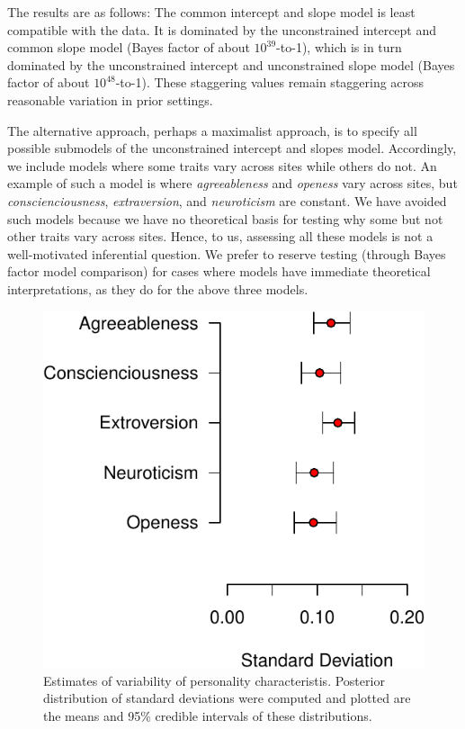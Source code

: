 \documentclass[english,man]{apa6}
\theoremstyle{definition}
\theoremstyle{definition}
\theoremstyle{remark}
\begin{document}
The results are as follows: The common intercept and slope model is
least compatible with the data. It is dominated by the unconstrained
intercept and common slope model (Bayes factor of about
\(10^{39}\)-to-1), which is in turn dominated by the unconstrained
intercept and unconstrained slope model (Bayes factor of about
\(10^{48}\)-to-1). These staggering values remain staggering across
reasonable variation in prior settings.

The alternative approach, perhaps a maximalist approach, is to specify
all possible submodels of the unconstrained intercept and slopes model.
Accordingly, we include models where some traits vary across sites while
others do not. An example of such a model is where \emph{agreeableness}
and \emph{openess} vary across sites, but \emph{conscienciousness},
\emph{extraversion}, and \emph{neuroticism} are constant. We have
avoided such models because we have no theoretical basis for testing why
some but not other traits vary across sites. Hence, to us, assessing all
these models is not a well-motivated inferential question. We prefer to
reserve testing (through Bayes factor model comparison) for cases where
models have immediate theoretical interpretations, as they do for the
above three models.

\begin{figure}[htbp]
\centering
\includegraphics{pBlind_files/figure-latex/corkEst2-1.pdf}
\caption{\label{fig:corkEst2}Estimates of variability of personality
characteristis. Posterior distribution of standard deviations were
computed and plotted are the means and 95\% credible intervals of these
distributions.}
\end{figure}
\end{document}
